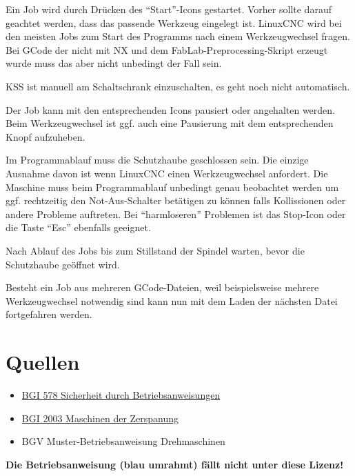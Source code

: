 \documentclass{\basedir/fablab-document}
\begin{document}
Ein Job wird durch Drücken des \enquote{Start}-Icons gestartet. Vorher sollte darauf geachtet werden,
dass das passende Werkzeug eingelegt ist. LinuxCNC wird bei den meisten Jobs zum Start des Programms nach einem Werkzeugwechsel fragen. Bei GCode der nicht mit NX und dem FabLab-Preprocessing-Skript erzeugt wurde muss das aber nicht unbedingt der Fall sein.

KSS ist manuell am Schaltschrank einzuschalten, es geht noch nicht automatisch.

Der Job kann mit den entsprechenden Icons pausiert oder angehalten werden. Beim Werkzeugwechsel ist ggf. auch eine Pausierung mit dem entsprechenden Knopf aufzuheben.

Im Programmablauf muss die Schutzhaube geschlossen sein. Die einzige Ausnahme davon ist wenn LinuxCNC einen Werkzeugwechsel anfordert. Die Maschine muss beim Programmablauf unbedingt genau beobachtet werden um ggf. rechtzeitig den Not-Aus-Schalter betätigen zu können falls Kollissionen oder andere Probleme auftreten. Bei \enquote{harmloseren} Problemen ist das Stop-Icon oder die Taste \enquote{Esc} ebenfalls geeignet.

Nach Ablauf des Jobs bis zum Stillstand der Spindel warten, bevor die Schutzhaube geöffnet wird.

Besteht ein Job aus mehreren GCode-Dateien, weil beispielsweise mehrere Werkzeugwechsel notwendig sind kann nun mit dem Laden der nächsten Datei fortgefahren werden.

\appendix

\section{Quellen}
\begin{itemize}
 \item \href{http://publikationen.dguv.de/dguv/pdf/10002/bgi578.pdf}{BGI 578 Sicherheit durch Betriebsanweisungen}
 \item \href{http://www.arbeitssicherheit.de/media/pdfs/CCC_1290.pdf}{BGI 2003 Maschinen der Zerspanung}
 \item BGV Muster-Betriebsanweisung Drehmaschinen
\end{itemize}


\textbf{Die Betriebsanweisung (blau umrahmt) fällt nicht unter diese Lizenz!}
\end{document}
